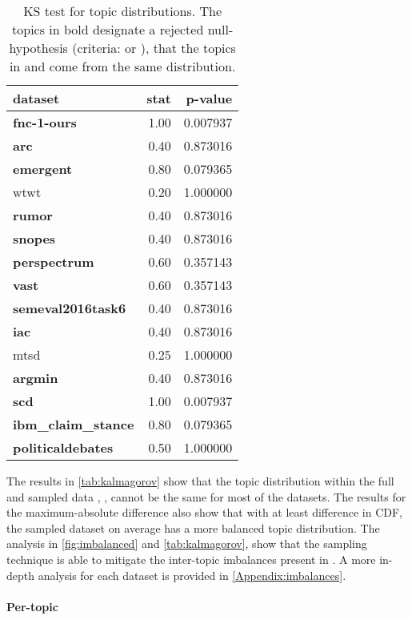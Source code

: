 \documentclass[11pt]{article}
\begin{document}
\begin{table}
\centering
\fontsize{10}{10}\selectfont
\begin{tabular}{@{}lrr@{}}
\toprule
 dataset                    & stat  & p-value  \\ \midrule
\textbf{fnc-1-ours}         & 1.00 & 0.007937 \\
\textbf{arc}                & 0.40 & 0.873016 \\
\textbf{emergent}           & 0.80 & 0.079365 \\
wtwt                        & 0.20 & 1.000000 \\
\textbf{rumor}              & 0.40 & 0.873016 \\
\textbf{snopes}             & 0.40 & 0.873016 \\
\textbf{perspectrum}        & 0.60 & 0.357143 \\
\textbf{vast}               & 0.60 & 0.357143 \\
\textbf{semeval2016task6}   & 0.40 & 0.873016 \\
\textbf{iac}                & 0.40 & 0.873016 \\
mtsd                        & 0.25 & 1.000000 \\
\textbf{argmin}             & 0.40 & 0.873016 \\
\textbf{scd}                & 1.00 & 0.007937 \\
\textbf{ibm\_claim\_stance} & 0.80 & 0.079365 \\
\textbf{politicaldebates}   & 0.50 & 1.000000 \\ \bottomrule
\end{tabular}\caption{KS test for topic distributions. The topics in bold designate a rejected null-hypothesis (criteria:  or ), that the topics in  and  come from the same distribution.}
\label{tab:kalmagorov}
\end{table}

The results in \autoref{tab:kalmagorov} show that the topic distribution within the full and sampled data , , cannot be the same for most of the datasets. The results for the maximum-absolute difference also show that with at least  difference in CDF, the sampled dataset  on average has a more balanced topic distribution. The analysis in \autoref{fig:imbalanced} and \autoref{tab:kalmagorov}, show that the sampling technique is able to mitigate the inter-topic imbalances present in . A more in-depth analysis for each dataset is provided in \autoref{Appendix:imbalances}.

\paragraph{Per-topic}
\end{document}
